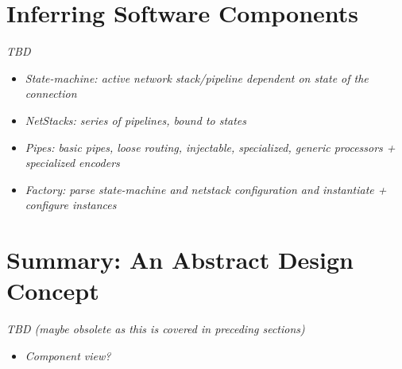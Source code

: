 \section{Inferring Software Components}
\label{sec:inferring-software-components}
\emph{TBD} %
\begin{itemize}
    \item \emph{State-machine: active network stack/pipeline dependent on state of the connection}
    \item \emph{NetStacks: series of pipelines, bound to states}
    \item \emph{Pipes: basic pipes, loose routing, injectable, specialized, generic processors + specialized encoders}
    \item \emph{Factory: parse state-machine and netstack configuration and instantiate + configure instances}
\end{itemize}

\section{Summary: An Abstract Design Concept}
\label{sec:abstract-design-concept}
\emph{TBD (maybe obsolete as this is covered in preceding sections)} %
\begin{itemize}
    \item \emph{Component view?}
\end{itemize}
